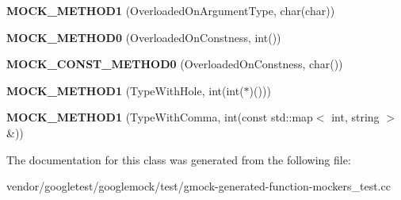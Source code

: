 \begin{DoxyCompactItemize}
{\bfseries M\+O\+C\+K\+\_\+\+M\+E\+T\+H\+O\+D1} (Overloaded\+On\+Argument\+Type, char(char))
\item 
\mbox{\label{classtesting_1_1gmock__generated__function__mockers__test_1_1_mock_foo_a291ff46b043d00d0f0acb081c5c36f2e}} 
{\bfseries M\+O\+C\+K\+\_\+\+M\+E\+T\+H\+O\+D0} (Overloaded\+On\+Constness, int())
\item 
\mbox{\label{classtesting_1_1gmock__generated__function__mockers__test_1_1_mock_foo_aa0da575ad3061850662c5f401ddb30c2}} 
{\bfseries M\+O\+C\+K\+\_\+\+C\+O\+N\+S\+T\+\_\+\+M\+E\+T\+H\+O\+D0} (Overloaded\+On\+Constness, char())
\item 
\mbox{\label{classtesting_1_1gmock__generated__function__mockers__test_1_1_mock_foo_a33077a71c1c5178c25b0a4aa099d5f2c}} 
{\bfseries M\+O\+C\+K\+\_\+\+M\+E\+T\+H\+O\+D1} (Type\+With\+Hole, int(int($\ast$)()))
\item 
\mbox{\label{classtesting_1_1gmock__generated__function__mockers__test_1_1_mock_foo_ad07ace4f4288418de7d9740e143da4ef}} 
{\bfseries M\+O\+C\+K\+\_\+\+M\+E\+T\+H\+O\+D1} (Type\+With\+Comma, int(const std\+::map$<$ int, string $>$ \&))
\end{DoxyCompactItemize}


The documentation for this class was generated from the following file\+:\begin{DoxyCompactItemize}
\item 
vendor/googletest/googlemock/test/gmock-\/generated-\/function-\/mockers\+\_\+test.\+cc\end{DoxyCompactItemize}
